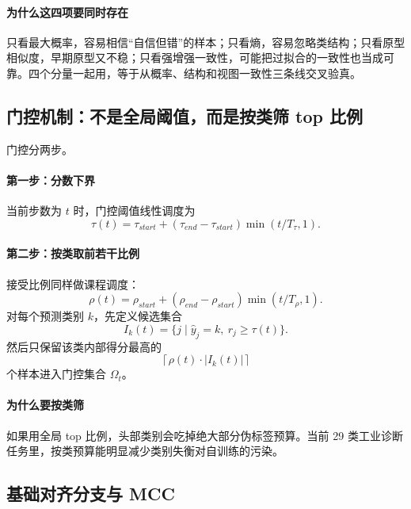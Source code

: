 \documentclass[12pt,a4paper]{ctexart}
\begin{document}
\paragraph{为什么这四项要同时存在} 只看最大概率，容易相信“自信但错”的样本；只看熵，容易忽略类结构；只看原型相似度，早期原型又不稳；只看强增强一致性，可能把过拟合的一致性也当成可靠。四个分量一起用，等于从概率、结构和视图一致性三条线交叉验真。

\subsection{门控机制：不是全局阈值，而是按类筛 top 比例}

门控分两步。

\paragraph{第一步：分数下界} 当前步数为 $t$ 时，门控阈值线性调度为
\begin{equation}
\tau(t)=\tau_{start}+(\tau_{end}-\tau_{start})\min(t/T_\tau,1).
\end{equation}

\paragraph{第二步：按类取前若干比例} 接受比例同样做课程调度：
\begin{equation}
\rho(t)=\rho_{start}+(\rho_{end}-\rho_{start})\min(t/T_\rho,1).
\end{equation}
对每个预测类别 $k$，先定义候选集合
\begin{equation}
I_k(t)=\{j\mid \hat y_j=k,\ r_j\ge \tau(t)\}.
\end{equation}
然后只保留该类内部得分最高的
\begin{equation}
\left\lceil \rho(t)\cdot |I_k(t)| \right\rceil
\end{equation}
个样本进入门控集合 $\Omega_t$。

\paragraph{为什么要按类筛} 如果用全局 top 比例，头部类别会吃掉绝大部分伪标签预算。当前 29 类工业诊断任务里，按类预算能明显减少类别失衡对自训练的污染。

\subsection{基础对齐分支与 MCC}
\end{document}

